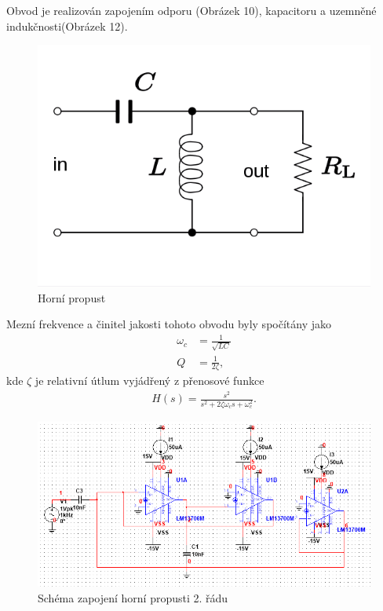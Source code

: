\documentclass[twoside]{article}
\begin{document}
\noindent Obvod je realizován zapojením odporu (Obrázek 10), kapacitoru a uzemněné indukčnosti(Obrázek 12).
\begin{figure}[H]
\centering
\includegraphics[scale=0.35]{high-pass.png}
\caption{Horní propust \cite{11}}
\end{figure}
\noindent Mezní frekvence a činitel jakosti tohoto obvodu byly spočítány jako 
\begin{align}
\omega _c &= \frac{1}{\sqrt{LC}}\\
Q &= \frac{1}{2 \zeta},
\end{align}
\noindent kde $\zeta$ je relativní útlum vyjádřený z přenosové funkce
\begin{align}
H(s) = \frac{s^2}{s^2 + 2 \zeta \omega _c s + \omega _c^2}.
\end{align}
\begin{figure}[H]
\centering
\includegraphics[scale=0.6]{hpsch.png}
\caption{Schéma zapojení horní propusti 2. řádu}
\end{figure}
\end{document}
